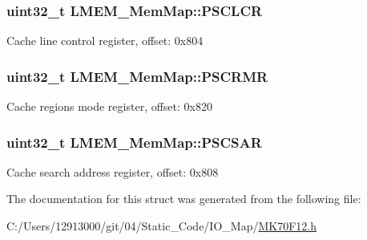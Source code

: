 \subsubsection[{P\+S\+C\+L\+C\+R}]{\setlength{\rightskip}{0pt plus 5cm}uint32\+\_\+t L\+M\+E\+M\+\_\+\+Mem\+Map\+::\+P\+S\+C\+L\+C\+R}\label{struct_l_m_e_m___mem_map_a9002773a5254b5d1ebb9a46218ef21c4}
Cache line control register, offset\+: 0x804 \hypertarget{struct_l_m_e_m___mem_map_a06dad54d3dcb178443d2c9b0d5ae2496}{}
\subsubsection[{P\+S\+C\+R\+M\+R}]{\setlength{\rightskip}{0pt plus 5cm}uint32\+\_\+t L\+M\+E\+M\+\_\+\+Mem\+Map\+::\+P\+S\+C\+R\+M\+R}\label{struct_l_m_e_m___mem_map_a06dad54d3dcb178443d2c9b0d5ae2496}
Cache regions mode register, offset\+: 0x820 \hypertarget{struct_l_m_e_m___mem_map_ad54ebfe0c32863df5645bc4416dfe3dc}{}
\subsubsection[{P\+S\+C\+S\+A\+R}]{\setlength{\rightskip}{0pt plus 5cm}uint32\+\_\+t L\+M\+E\+M\+\_\+\+Mem\+Map\+::\+P\+S\+C\+S\+A\+R}\label{struct_l_m_e_m___mem_map_ad54ebfe0c32863df5645bc4416dfe3dc}
Cache search address register, offset\+: 0x808 

The documentation for this struct was generated from the following file\+:\begin{DoxyCompactItemize}
\item 
C\+:/\+Users/12913000/git/04/\+Static\+\_\+\+Code/\+I\+O\+\_\+\+Map/\hyperlink{_m_k70_f12_8h}{M\+K70\+F12.\+h}\end{DoxyCompactItemize}
